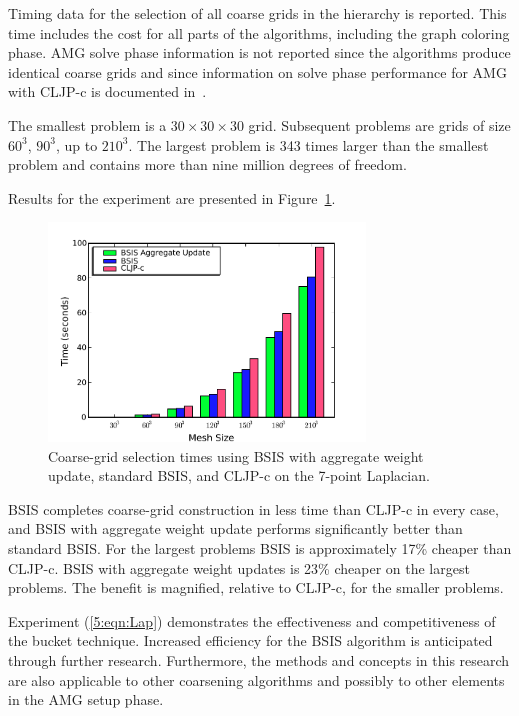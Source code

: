 \documentclass{elsart}
\begin{document}
Timing data for the selection of all coarse grids in the hierarchy is
reported. This time includes the cost for all parts of the algorithms,
including the graph coloring phase. AMG solve phase information is not
reported since the algorithms produce identical coarse grids and since
information on solve phase performance for AMG with CLJP-c is
documented in~\cite{alber-cljpc,alber-PCGS}.

The smallest problem is a $30 \times 30 \times 30$ grid. Subsequent
problems are grids of size $60^3$, $90^3$, up to $210^3$. The largest
problem is 343 times larger than the smallest problem and contains
more than nine million degrees of freedom.

Results for the experiment are presented in
Figure~\ref{5:fig:results-full}.
\begin{figure}
  \begin{center}
    \includegraphics[width=0.75\textwidth]{images/agg-no-scaling}
    \caption{Coarse-grid selection times using BSIS with aggregate
    weight update, standard BSIS, and CLJP-c on the 7-point
    Laplacian.}
    \label{5:fig:results-full}
  \end{center}
\end{figure}
BSIS completes coarse-grid construction in less time than CLJP-c in
every case, and BSIS with aggregate weight update performs
significantly better than standard BSIS. For the largest problems BSIS
is approximately 17\% cheaper than CLJP-c. BSIS with aggregate weight
updates is 23\% cheaper on the largest problems. The benefit is
magnified, relative to CLJP-c, for the smaller problems.

Experiment (\ref{5:eqn:Lap}) demonstrates the effectiveness and
competitiveness of the bucket technique. Increased efficiency for the
BSIS algorithm is anticipated through further research. Furthermore,
the methods and concepts in this research are also applicable to other
coarsening algorithms and possibly to other elements in the AMG setup
phase.
\end{document}
